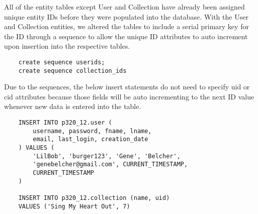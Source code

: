 \documentclass[12pt]{article}
\begin{document}
    
%
%


    \noindent All of the entity tables except User and Collection have already
    been assigned unique entity IDs before they were populated into
    the database. With the User and Collection entities, we altered the
    tables to include a serial primary key for the ID through a sequence
    to allow the unique ID attributes to auto increment upon insertion
    into the respective tables.
    \begin{lstlisting}
    create sequence userids;
    create sequence collection_ids
    \end{lstlisting}
    Due to the sequences, the below insert statements do not need to specify
    uid or cid attributes because those fields will be auto incrementing
    to the next ID value whenever new data is entered into the table.
    \begin{lstlisting}
    INSERT INTO p320_12.user (
        username, password, fname, lname,
        email, last_login, creation_date
    ) VALUES (
        'LilBob', 'burger123', 'Gene', 'Belcher',
        'genebelcher@gmail.com', CURRENT_TIMESTAMP,
        CURRENT_TIMESTAMP
    )

    INSERT INTO p320_12.collection (name, uid)
    VALUES ('Sing My Heart Out', 7)
    \end{lstlisting}
\end{document}
